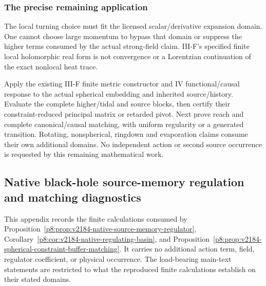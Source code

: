 \documentclass[12pt,a4paper]{article}
\begin{document}
\subsubsection{The precise remaining application}
The local turning choice must fit the licensed scalar/derivative expansion
domain. One cannot choose large momentum to bypass that domain or suppress
the higher terms consumed by the actual strong-field claim. III-F's specified
finite local holomorphic real form is not convergence or a Lorentzian
continuation of the exact nonlocal heat trace.

Apply the existing III-F finite metric constructor and IV functional/causal
response to the actual spherical embedding and inherited source/history.
Evaluate the complete higher/tidal and source blocks, then certify their
constraint-reduced principal matrix or retarded pivot. Next prove reach and
complete canonical/causal matching, with uniform regularity or a generated
transition. Rotating, nonspherical, ringdown and evaporation claims consume
their own additional domains. No independent action or second source
occurrence is requested by this remaining mathematical work.




\subsection{Native black-hole source-memory regulation and matching diagnostics}
\label{p8:app:black-hole-native-regulation}

This appendix records the finite calculations consumed by
Proposition~\ref{p8:prop:v2184-native-source-memory-regulator},
Corollary~\ref{p8:cor:v2184-native-regulating-basin}, and
Proposition~\ref{p8:prop:v2184-spherical-constraint-buffer-matching}.
It carries no additional action term, field, regulator coefficient, or
physical occurrence.  The load-bearing main-text statements are restricted to
what the reproduced finite calculations establish on their stated domains.

\end{document}
